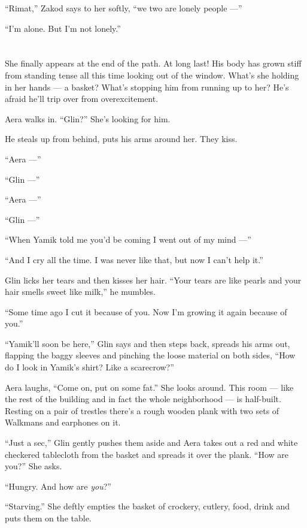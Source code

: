\documentclass[twoside,11pt,openany]{book}
\begin{document}
``Rimat,'' Zakod says to her softly, ``we two are lonely people ---''

``I'm alone. But I'm not lonely.''


\chapter{}

She finally appears at the end of the path. At long last! His body has grown stiff from standing
tense{ }all this time looking out of the window. What's she holding in her
hands --- a basket? What's stopping him from running up to her?  He's afraid he'll trip over from overexcitement.

Aera walks in. ``Glin?'' She's looking for him.

He steals up from behind, puts his arms around her. They kiss.

``Aera ---''

``Glin ---''

``Aera ---''

``Glin ---''

``When Yamik told me you{'}d be coming I went out of my mind ---''

``And I cry all the time. I was never like that, but now I can't help it.''

Glin licks her tears and then kisses her hair. ``Your tears are like pearls and your hair smells sweet
like milk,'' he mumbles.

``Some time ago I cut it because of you. Now I'm growing it again because of you.''

``Yamik'll soon be here,'' Glin says and then steps back, spreads
his arms out, flapping the baggy sleeves and pinching the loose material on
both sides, ``How do I look in Yamik's shirt? Like a scarecrow?''

Aera laughs, ``Come on, put on some fat.'' She looks around. This room ---  like the rest of
the building and in fact the whole neighborhood --- is half-built. Resting on
a pair of trestles there's a rough wooden plank with two sets of Walkmans and earphones on it.

``Just a sec,'' Glin gently pushes them aside and Aera takes out a red and white checkered
tablecloth from the basket and spreads it over the plank. ``How are you?'' She asks.

``Hungry. And how are \textit{you}?''

``Starving.'' She deftly empties the basket of crockery, cutlery, food, drink and puts them on
the table.
\end{document}
